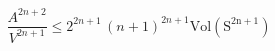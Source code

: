 \begin{equation}
\frac{A^{2n+2}}{V^{2n+1}}\le 2^{2n+1}\,(n+1)^{2n+1}\mathrm{Vol(S^{2n+1})}\label{TNequ1}
\end{equation}

